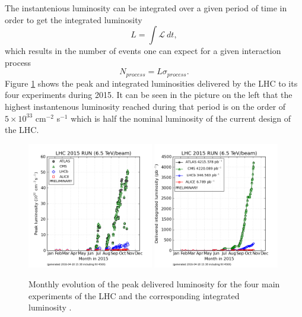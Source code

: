     The instantenious luminosity can be integrated over a given period of time in order to get the integrated luminosity
  	\begin{equation}
  		L = \int \mathcal{L} \ dt ,
  	\end{equation}
  	which results in the number of events one can expect for a given interaction process
  	\begin{equation}
  		N_{process} = L \sigma_{process} .
  	\end{equation}
    Figure \ref{fig:I-2-luminosity} shows the peak and integrated luminosities delivered by the LHC to its four experiments during 2015. It can be seen in the picture on the left that the highest instantenous luminosity reached during that period is on the order of $ 5 \times 10^{33} $ cm$^{-2}$ s$^{-1}$ which is half the nominal luminosity of the current design of the LHC.

		\begin{figure}[h!]
			\centering
			\includegraphics[width=0.49\textwidth]{img/I-2-LHC/luminosity-peak.png}
			\includegraphics[width=0.49\textwidth]{img/I-2-LHC/luminosity-integrated.png}
			\caption{Monthly evolution of the peak delivered luminosity for the four main experiments of the LHC and the corresponding integrated luminosity \cite{LUMI-PP-LPC}.}
			\label{fig:I-2-luminosity}
		\end{figure}

